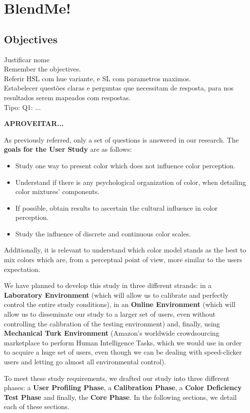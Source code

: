 
\chapter{BlendMe!}
\label{chapter:design}

\section{Objectives}
\label{sec:impl_objectives}
Justificar nome \\
Remember the objectives. \\
Referir HSL com hue variante, e SL com parametros maximos. \\
Estabelecer questões claras e perguntas que necessitam de resposta, para nos resultados serem mapeados com respostas. \\
Tipo: Q1: ... \par
%
\textbf{APROVEITAR...} \par
%
As previously referred, only a set of questions is answered in our research. The \textbf{goals for the User Study} are as follows:
%
\begin{itemize}
	\item Study one way to present color which does not influence color perception.
  \item Understand if there is any psychological organization of color, when detailing color mixtures' components.
  \item If possible, obtain results to ascertain the cultural influence in color perception.
  \item Study the influence of discrete and continuous color scales.
\end{itemize}
%
Additionally, it is relevant to understand which color model stands as the best to mix colors which are, from a perceptual point of view, more similar to the users expectation. \par

We have planned to develop this study in three different strands: in a \textbf{Laboratory Environment} (which will allow us to calibrate and perfectly control the entire study conditions), in an \textbf{Online Environment} (which will allow us to disseminate our study to a larger set of users, even without controlling the calibration of the testing environment) and, finally, using \textbf{Mechanical Turk Environment} (Amazon's worldwide crowdsourcing marketplace to perform Human Intelligence Tasks, which we would use in order to acquire a huge set of users, even though we can be dealing with speed-clicker users and letting go almost all environmental control). \par
%
To meet these study requirements, we drafted our study into three different phases: a \textbf{User Profiling Phase}, a \textbf{Calibration Phase}, a \textbf{Color Deficiency Test Phase} and finally, the \textbf{Core Phase}. In the following sections, we detail each of these sections. \par
%
